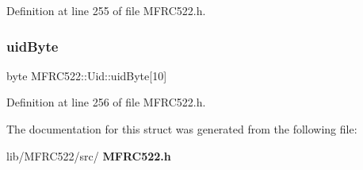 Definition at line 255 of file M\+F\+R\+C522.\+h.

\mbox{\label{struct_m_f_r_c522_1_1_uid_a5581167c1e1c8beb98c44ff86f4fbc52}} 
\subsubsection{uid\+Byte}
{\footnotesize\ttfamily byte M\+F\+R\+C522\+::\+Uid\+::uid\+Byte[10]}



Definition at line 256 of file M\+F\+R\+C522.\+h.



The documentation for this struct was generated from the following file\+:\begin{DoxyCompactItemize}
\item 
lib/\+M\+F\+R\+C522/src/\textbf{ M\+F\+R\+C522.\+h}\end{DoxyCompactItemize}
